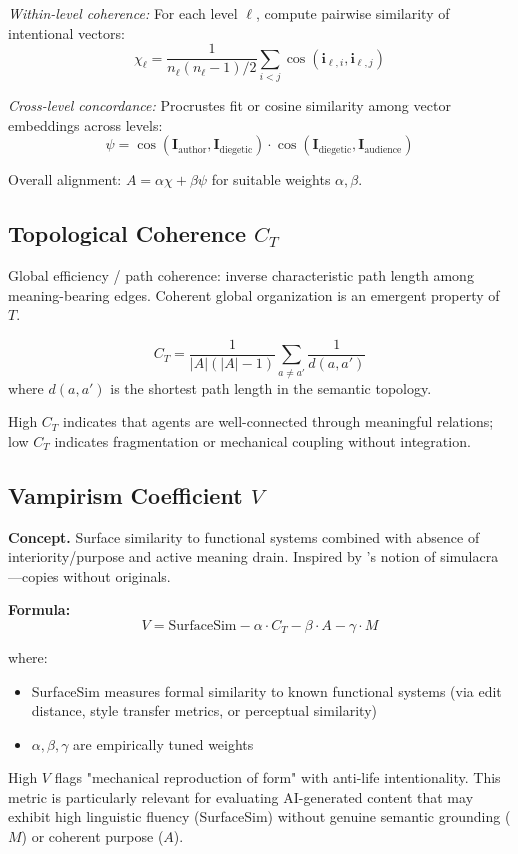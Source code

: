 \documentclass[12pt]{article}
\begin{document}
\textit{Within-level coherence:} For each level $\ell$, compute pairwise similarity of intentional vectors:
\[
\chi_\ell = \frac{1}{n_\ell(n_\ell-1)/2} \sum_{i<j} \cos(\mathbf{i}_{\ell,i}, \mathbf{i}_{\ell,j})
\]

\textit{Cross-level concordance:} Procrustes fit or cosine similarity among vector embeddings across levels:
\[
\psi = \cos(\mathbf{I}_{\text{author}}, \mathbf{I}_{\text{diegetic}}) \cdot \cos(\mathbf{I}_{\text{diegetic}}, \mathbf{I}_{\text{audience}})
\]

Overall alignment: $A = \alpha \chi + \beta \psi$ for suitable weights $\alpha, \beta$.

\subsection{Topological Coherence $C_T$}

Global efficiency / path coherence: inverse characteristic path length among meaning-bearing edges. Coherent global organization is an emergent property of $T$.

\[
C_T = \frac{1}{|A|(|A|-1)} \sum_{a \neq a'} \frac{1}{d(a, a')}
\]
where $d(a, a')$ is the shortest path length in the semantic topology.

High $C_T$ indicates that agents are well-connected through meaningful relations; low $C_T$ indicates fragmentation or mechanical coupling without integration.

\subsection{Vampirism Coefficient $V$}

\textbf{Concept.} Surface similarity to functional systems combined with absence of interiority/purpose and active meaning drain. Inspired by \citet{baudrillard1981simulacra}'s notion of simulacra—copies without originals.

\textbf{Formula:}
\[
V = \text{SurfaceSim} - \alpha \cdot C_T - \beta \cdot A - \gamma \cdot M
\]

where:
\begin{itemize}
\item SurfaceSim measures formal similarity to known functional systems (via edit distance, style transfer metrics, or perceptual similarity)
\item $\alpha, \beta, \gamma$ are empirically tuned weights
\end{itemize}

High $V$ flags "mechanical reproduction of form" with anti-life intentionality. This metric is particularly relevant for evaluating AI-generated content that may exhibit high linguistic fluency (SurfaceSim) without genuine semantic grounding ($M$) or coherent purpose ($A$).
\end{document}
